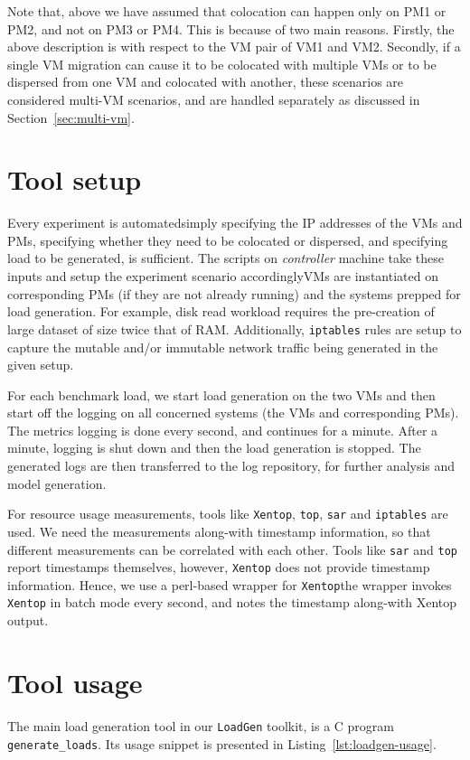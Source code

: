 Note that, above we have assumed that colocation can happen only on 
PM1 or PM2, and not on PM3 or PM4. This is because of two main reasons.
Firstly, the above description is with respect to the VM pair of VM1 
and VM2. Secondly, if a single VM migration can cause it to be
colocated with multiple VMs or to be dispersed from one VM and
colocated with another, these scenarios are considered multi-VM
scenarios, and are handled separately as discussed in Section~\ref{sec:multi-vm}.

\section{Tool setup}
Every experiment is automated\textemdash{}simply specifying the IP addresses of the VMs and PMs,
specifying whether they need to be colocated or dispersed, 
and specifying load to be generated, is sufficient. The scripts
on \textit{controller} machine take these inputs and setup the experiment scenario
accordingly\textemdash{}VMs are instantiated on corresponding PMs (if they are not already running)
and the systems prepped for load generation. For example, disk read workload requires
the pre-creation of large dataset of size twice that of RAM. Additionally, \texttt{iptables}
rules are setup to capture the mutable and/or immutable network traffic being generated
in the given setup.

For each benchmark load, we start load generation on the two VMs and then start off the
logging on all concerned systems (the VMs and corresponding PMs). The metrics logging
is done every second, and continues for a minute. After a minute, logging is shut down and then
the load generation is stopped. The generated logs are then transferred to the log 
repository, for further analysis and model generation. 

For resource usage measurements, tools like \texttt{Xentop}, \texttt{top},
\texttt{sar} and \texttt{iptables} are used. We need the measurements along-with
timestamp information, so that different measurements can be correlated with
each other. Tools like \texttt{sar} and \texttt{top} report timestamps themselves,
however, \texttt{Xentop} does not provide timestamp information. Hence, we use
a perl-based wrapper for \texttt{Xentop}\textemdash{}the wrapper invokes \texttt{Xentop}
in batch mode every second, and notes the timestamp along-with Xentop output.

\section{Tool usage}
The main load generation tool in our \texttt{LoadGen} toolkit, 
is a C program \texttt{generate\_loads}. Its usage snippet is presented 
in Listing~\ref{lst:loadgen-usage}.

